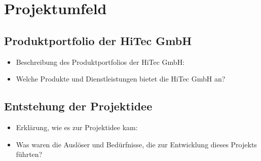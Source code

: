 
\section{Projektumfeld}\label{projektumfeld}

\subsection{Produktportfolio der HiTec GmbH}\label{produktportfolio-der-hitec-gmbh}

\begin{itemize}
  \item
        Beschreibung des Produktportfolios der HiTec GmbH:
  \item
        Welche Produkte und Dienstleistungen bietet die HiTec GmbH an?
\end{itemize}

\subsection{Entstehung der Projektidee}\label{entstehung-der-projektidee}

\begin{itemize}
  \item
        Erklärung, wie es zur Projektidee kam:
  \item
        Was waren die Auslöser und Bedürfnisse, die zur Entwicklung dieses Projekts führten?
\end{itemize}